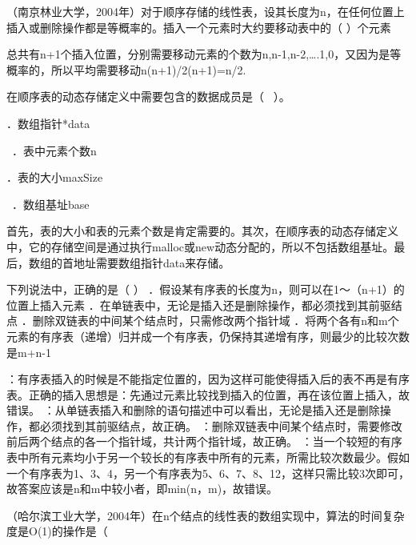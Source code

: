 \question （南京林业大学，2004年）对于顺序存储的线性表，设其长度为n，在任何位置上插入或删除操作都是等概率的。插入一个元素时大约要移动表中的（
）个元素
\par{}
\begin{solution}总共有n+1个插入位置，分别需要移动元素的个数为n,n-1,n-2,\ldots{}.1,0，又因为是等概率的，所以平均需要移动n(n+1)/2(n+1)=n/2.
\end{solution}
\question 在顺序表的动态存储定义中需要包含的数据成员是（ ~）。~

．数组指针*data

~．表中元素个数n~

．表的大小maxSize

~．数组基址base
\par{}
\begin{solution}首先，表的大小和表的元素个数是肯定需要的。其次，在顺序表的动态存储定义中，它的存储空间是通过执行malloc或new动态分配的，所以不包括数组基址。最后，数组的首地址需要数组指针data来存储。
\end{solution}
\question 下列说法中，正确的是（ ）
．假设某有序表的长度为n，则可以在1～（n+1）的位置上插入元素
．在单链表中，无论是插入还是删除操作，都必须找到其前驱结点
．删除双链表的中间某个结点时，只需修改两个指针域
．将两个各有n和m个元素的有序表（递增）归并成一个有序表，仍保持其递增有序，则最少的比较次数是m+n-1
\par{}
\begin{solution}：有序表插入的时候是不能指定位置的，因为这样可能使得插入后的表不再是有序表。正确的插入思想是：先通过元素比较找到插入的位置，再在该位置上插入，故错误。
：从单链表插入和删除的语句描述中可以看出，无论是插入还是删除操作，都必须找到其前驱结点，故正确。
：删除双链表中间某个结点时，需要修改前后两个结点的各一个指针域，共计两个指针域，故正确。
：当一个较短的有序表中所有元素均小于另一个较长的有序表中所有的元素，所需比较次数最少。假如一个有序表为1、3、4，另一个有序表为5、6、7、8、12，这样只需比较3次即可，故答案应该是n和m中较小者，即min(n，m)，故错误。
\end{solution}
\question （哈尔滨工业大学，2004年）在n个结点的线性表的数组实现中，算法的时间复杂度是O(1)的操作是（

